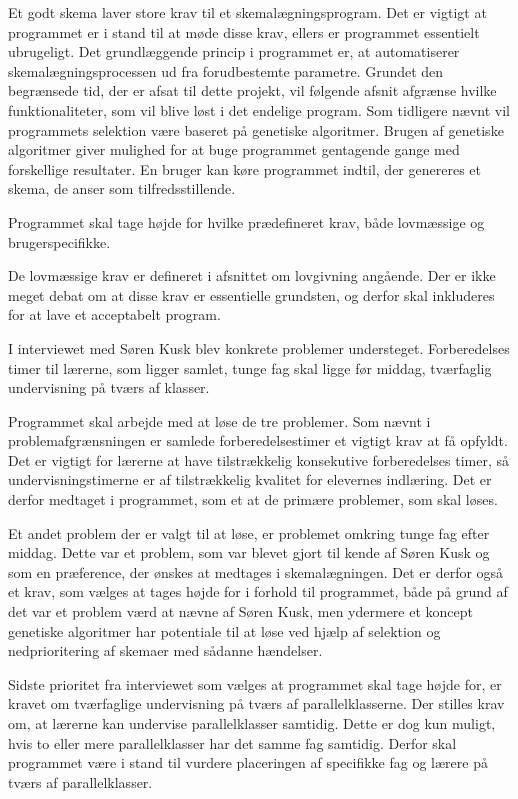 Et godt skema laver store krav til et skemalægningsprogram. Det er vigtigt at programmet er i stand til at møde disse krav, ellers er programmet essentielt ubrugeligt. Det grundlæggende princip i programmet er, at automatiserer skemalægningsprocessen ud fra forudbestemte parametre. Grundet den begrænsede tid, der er afsat til dette projekt, vil følgende afsnit afgrænse hvilke funktionaliteter, som vil blive løst i det endelige program.
Som tidligere nævnt vil programmets selektion være baseret på genetiske algoritmer. Brugen af genetiske algoritmer giver mulighed for at buge programmet gentagende gange med forskellige resultater. En bruger kan køre programmet indtil, der genereres et skema, de anser som tilfredsstillende.

Programmet skal tage højde for hvilke prædefineret krav, både lovmæssige og brugerspecifikke.

De lovmæssige krav er defineret i afsnittet om lovgivning angående. Der er ikke meget debat om at disse krav er essentielle grundsten, og derfor skal inkluderes for at lave et acceptabelt program. 

I interviewet med Søren Kusk blev konkrete problemer understeget. Forberedelses timer til lærerne, som ligger samlet, tunge fag skal ligge før middag, tværfaglig undervisning på tværs af klasser.

Programmet skal arbejde med at løse de tre problemer. Som nævnt i problemafgrænsningen er samlede forberedelsestimer et vigtigt krav at få opfyldt. Det er vigtigt for lærerne at have tilstrækkelig konsekutive forberedelses timer, så undervisningstimerne er af tilstrækkelig kvalitet for elevernes indlæring. Det er derfor medtaget i programmet, som et at de primære problemer, som skal løses. 

Et andet problem der er valgt til at løse, er problemet omkring tunge fag efter middag. Dette var et problem, som var blevet gjort til kende af Søren Kusk og som en præference, der ønskes at medtages i skemalægningen. Det er derfor også et krav, som vælges at tages højde for i forhold til programmet, både på grund af det var et problem værd at nævne af Søren Kusk, men ydermere et koncept genetiske algoritmer har potentiale til at løse ved hjælp af selektion og nedprioritering af skemaer med sådanne hændelser.

Sidste prioritet fra interviewet som vælges at programmet skal tage højde for, er kravet om tværfaglige undervisning på tværs af parallelklasserne. Der stilles krav om, at lærerne kan undervise parallelklasser samtidig. Dette er dog kun muligt, hvis to eller mere parallelklasser har det samme fag samtidig. Derfor skal programmet være i stand til vurdere placeringen af specifikke fag og lærere på tværs af parallelklasser. 

